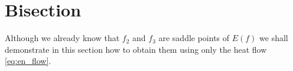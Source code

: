 \section{Bisection}
\label{sec:bisection}


Although we already know that $f_2$ and $f_3$ are saddle points of
$E(f)$ we shall demonstrate in this section how to obtain them using
only the heat flow \eqref{eq:en_flow}.\\

